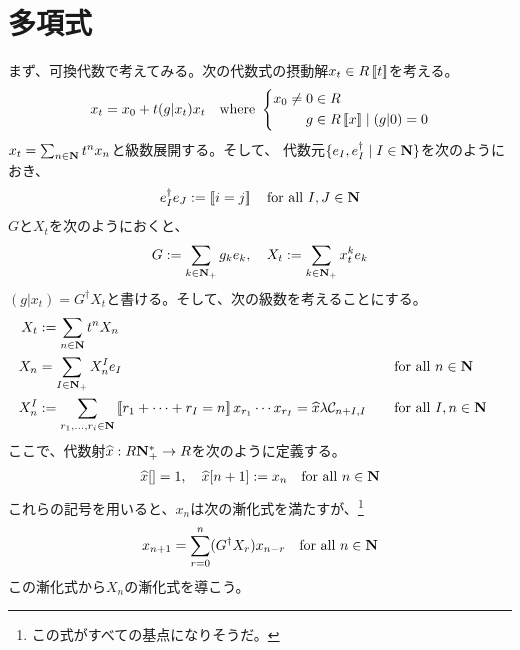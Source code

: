 \begingroup %
\newcommand{\word}[1]{{\blra{#1}}}
\newcommand{\hbeta}{{\what{\beta}}}
\newcommand{\hg}{{\what{g}}}
\newcommand{\hx}{{\what{x}}}
\newcommand{\hG}{{\what{G}}}
{\setlength\arraycolsep{2pt}
%
\section{多項式}\label{s1:多項式} %
	まず、可換代数で考えてみる。次の代数式の摂動解$x_t\in R\mathinner{[\![{t}]\!]}$を考える。
	\begin{equation*}\begin{split}
		x_t = x_0 + t(g|x_t)x_t \quad\text{where } \left\{\begin{split}
			x_0\neq 0 &\in R \\
			g &\in R\mathinner{[\![{x}]\!]}\mid (g|0) = 0
		\end{split}\right.
	\end{split}\end{equation*}
	$x_t=\sum_{n\in\mathbf{N}}t^nx_n$と級数展開する。そして、
	代数元$\mathinner{\{{e_I,e_I^\dag\mid I\in\ensuremath{\mathbf{N}}}\}}$を次のようにおき、
	\begin{equation*}\begin{split}
		e_I^\dag e_J := \mathinner{[\![i=j]\!]} \quad\text{for all } I,J\in\mathbf{N}
	\end{split}\end{equation*}
	$G$と$X_t$を次のようにおくと、
	\begin{equation*}\begin{split}
		G := \sum_{k\in\mathbf{N}_+}g_ke_k,\quad X_t := \sum_{k\in\mathbf{N}_+}x_t^ke_k
	\end{split}\end{equation*}
	$(g|x_t)=G^\dag X_t$と書ける。そして、次の級数を考えることにする。
	\begin{alignat*}{2}
		X_t &:= \sum_{n\in\mathbf{N}}t^nX_n \\
		X_n &= \sum_{I\in\mathbf{N}_+}X_n^I e_I &&\quad\text{for all } n\in\mathbf{N} \\
		X_n^I &:= \sum_{r_1,\dots,r_i\in\mathbf{N}} \mathinner{[\![r_1+\cdots+r_I=n]\!]} 
			x_{r_1}\cdots x_{r_I}
		= {\widehat{x}}\lambda{\mathcal{C}}_{n+I,I}
		&&\quad\text{for all } I,n\in\mathbf{N}
	\end{alignat*}
	ここで、代数射${\widehat{x}}:R\mathbf{N}_+^*\to R$を次のように定義する。
	\begin{equation*}\begin{split}
		\what{x}\word{} = 1,\quad
		\what{x}\word{n+1} := x_n \quad\text{for all }n\in\sizen
	\end{split}\end{equation*}
	これらの記号を用いると、$x_n$は次の漸化式を満たすが、\footnote{
		この式がすべての基点になりそうだ。
	}
	\begin{equation}\begin{split}
		x_{n+1} = \sum_{r=0}^n(G^\dag X_r)x_{n-r} 
		\quad\text{for all } n\in\mathbf{N}
	\end{split}\end{equation}
	この漸化式から$X_n$の漸化式を導こう。

}
